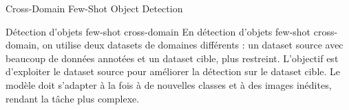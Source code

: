 \begin{subsectionframemod}{Cross-Domain Few-Shot Object Detection}

    \begin{alertblock}{Détection d'objets few-shot cross-domain}
        En détection d'objets few-shot cross-domain, on utilise deux datasets de domaines différents :
        un dataset source avec beaucoup de données annotées et un dataset cible, plus restreint.
        L'objectif est d'exploiter le dataset source pour améliorer la détection sur le dataset cible.
        Le modèle doit s'adapter à la fois à de nouvelles classes et à des images inédites, rendant la tâche plus complexe.
    \end{alertblock}

    \pause
    \pause
\end{subsectionframemod}
